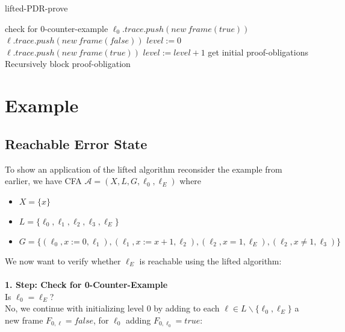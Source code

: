 \documentclass[11pt, a4paper, BCOR=10mm, ngerman, oneside]{scrbook}
\begin{document}
\begin{algorithm}[H] 
\caption{lifted-PDR-prove}
\begin{algorithmic}[1]
\State check for 0-counter-example
\State $\ell_0.trace.push(new\ frame(true))$
	\State $\ell.trace.push(new\ frame(false))$
\EndFor
\State $level := 0$
\Statex
\Loop
		\State $\ell.trace.push(new\ frame(true))$
	\EndFor
	\State $level:= level + 1$
	\State get initial proof-obligations 
	\Statex
	\State Recursively block proof-obligation
	\EndIf
	\EndWhile

	\Statex	
			\EndIf
		\EndFor
	\EndFor
\EndLoop
\EndProcedure
\end{algorithmic}
\end{algorithm}

\section{Example}
\subsection{Reachable Error State}
To show an application of the lifted algorithm reconsider the example from earlier, we have CFA  $\mathcal{A} = (X, L, G, \ell_0, \ell_E)$ where
\begin{itemize}
\item $X = \{x\}$
\item $L = \{\ell_0, \ell_1, \ell_2, \ell_3, \ell_E\}$
\item $G = \{(\ell_0, x := 0, \ell_1), (\ell_1, x := x + 1, \ell_2), (\ell_2, x = 1, \ell_E), (\ell_2, x \neq 1, \ell_3) \}$
\end{itemize}

We now want to verify whether $\ell_E$ is reachable using the lifted algorithm: \\ \\

\textbf{1. Step: Check for 0-Counter-Example} \\
Is $\ell_0 = \ell_E$?  \\
No, we continue with initializing level 0 by adding to each $\ell \in L \backslash \{\ell_0, \ell_E\}$ a new frame $F_{0, \ell} = false$, for $\ell_0$ adding $F_{0, \ell_0} = true$: \\ \\
\end{document}
